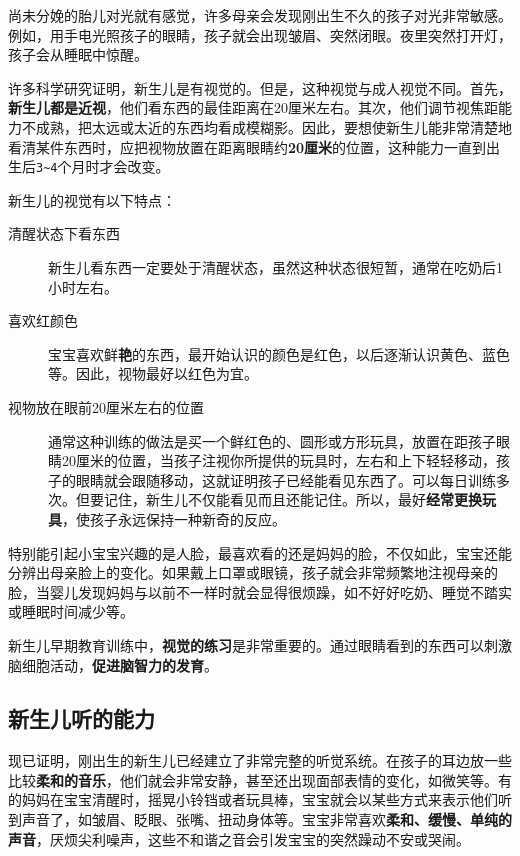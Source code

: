 尚未分娩的胎儿对光就有感觉，许多母亲会发现刚出生不久的孩子对光非常敏感。例如，用手电光照孩子的眼睛，孩子就会出现皱眉、突然闭眼。夜里突然打开灯，孩子会从睡眠中惊醒。

许多科学研究证明，新生儿是有视觉的。但是，这种视觉与成人视觉不同。首先，\textbf{新生儿都是近视}，他们看东西的最佳距离在20厘米左右。其次，他们调节视焦距能力不成熟，把太远或太近的东西均看成模糊影。因此，要想使新生儿能非常清楚地看清某件东西时，应把视物放置在距离眼睛约\textbf{20厘米}的位置，这种能力一直到出生后\texttt{3\textasciitilde{}4}\hspace{0pt}个月时才会改变。

新生儿的视觉有以下特点：

\begin{description}

\item
[清醒状态下看东西]新生儿看东西一定要处于清醒状态，虽然这种状态很短暂，通常在吃奶后1小时左右。
\item
[喜欢红颜色]宝宝喜欢鲜\textbf{艳}的东西，最开始认识的颜色是红色，以后逐渐认识黄色、蓝色等。因此，视物最好以红色为宜。
\item
[视物放在眼前20厘米左右的位置]通常这种训练的做法是买一个鲜红色的、圆形或方形玩具，放置在距孩子眼睛20厘米的位置，当孩子注视你所提供的玩具时，左右和上下轻轻移动，孩子的眼睛就会跟随移动，这就证明孩子已经能看见东西了。可以每日训练多次。但要记住，新生儿不仅能看见而且还能记住。所以，最好\textbf{经常更换玩具}，使孩子永远保持一种新奇的反应。
\end{description}

特别能引起小宝宝兴趣的是人脸，最喜欢看的还是妈妈的脸，不仅如此，宝宝还能分辨出母亲脸上的变化。如果戴上口罩或眼镜，孩子就会非常频繁地注视母亲的脸，当婴儿发现妈妈与以前不一样时就会显得很烦躁，如不好好吃奶、睡觉不踏实或睡眠时间减少等。

新生儿早期教育训练中，\textbf{视觉的练习}是非常重要的。通过眼睛看到的东西可以刺激脑细胞活动，\textbf{促进脑智力的发育}。


\subsection{新生儿听的能力}%

现已证明，刚出生的新生儿已经建立了非常完整的听觉系统。在孩子的耳边放一些比较\textbf{柔和的音乐}，他们就会非常安静，甚至还出现面部表情的变化，如微笑等。有的妈妈在宝宝清醒时，摇晃小铃铛或者玩具棒，宝宝就会以某些方式来表示他们听到声音了，如皱眉、眨眼、张嘴、扭动身体等。宝宝非常喜欢\textbf{柔和、缓慢、单纯的声音}，厌烦尖利噪声，这些不和谐之音会引发宝宝的突然躁动不安或哭闹。

